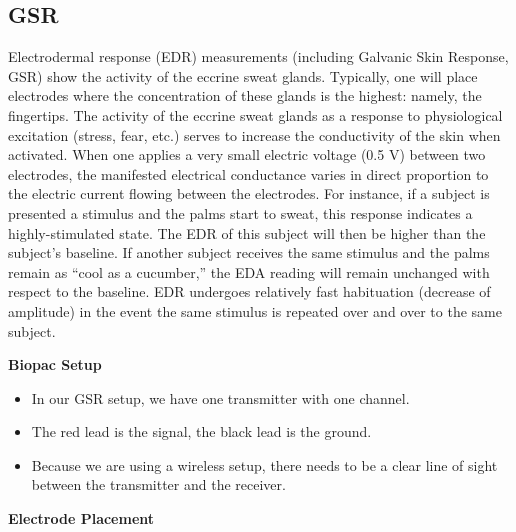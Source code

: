 \documentclass[
]{book}
\providecommand{\tightlist}{%
  \setlength{\itemsep}{0pt}\setlength{\parskip}{0pt}}
\begin{document}
\hypertarget{gsr}{%
\subsection{GSR}\label{gsr}}

Electrodermal response (EDR) measurements (including Galvanic Skin Response, GSR) show the activity of the eccrine sweat glands. Typically, one will place electrodes where the concentration of these glands is the highest: namely, the fingertips. The activity of the eccrine sweat glands as a response to physiological excitation (stress, fear, etc.) serves to increase the conductivity of the skin when activated. When one applies a very small electric voltage (0.5 V) between two electrodes, the manifested electrical conductance varies in direct proportion to the electric current flowing between the electrodes. For instance, if a subject is presented a stimulus and the palms start to sweat, this response indicates a highly-stimulated state. The EDR of this subject will then be higher than the subject's baseline. If another subject receives the same stimulus and the palms remain as ``cool as a cucumber,'' the EDA reading will remain unchanged with respect to the baseline. EDR undergoes relatively fast habituation (decrease of amplitude) in the event the same stimulus is repeated over and over to the same subject.

\textbf{Biopac Setup}

\begin{itemize}
\tightlist
\item
  In our GSR setup, we have one transmitter with one channel.
\item
  The red lead is the signal, the black lead is the ground.
\item
  Because we are using a wireless setup, there needs to be a clear line of sight between the transmitter and the receiver.
\end{itemize}

\textbf{Electrode Placement}
\end{document}
